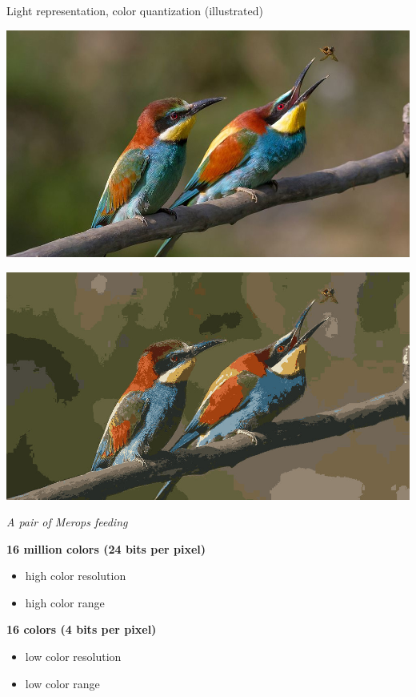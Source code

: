 \begin{frame}{Light representation, color quantization (illustrated)}
  \begin{minipage}[b]{0.45\textwidth}
    \centering
    \includegraphics[width=\textwidth]{slides/graphics-introduction/pair-of-merops.jpg}
  \end{minipage}
  \hfill
  \begin{minipage}[b]{0.45\textwidth}
    \centering
    \includegraphics[width=\textwidth]{slides/graphics-introduction/pair-of-merops-16-colors.jpg}
  \end{minipage}

  \begin{center}
     \textit{\small A pair of Merops feeding}
  \end{center}

  \begin{minipage}[b]{0.45\textwidth}
    \centering
    \textbf{16 million colors (24 bits per pixel)}
    \begin{itemize}
    \item high color resolution
    \item high color range
    \end{itemize}
  \end{minipage}
  \hfill
  \begin{minipage}[b]{0.45\textwidth}
    \centering
    \textbf{16 colors (4 bits per pixel)}
    \begin{itemize}
    \item low color resolution
    \item low color range
    \end{itemize}
  \end{minipage}
\end{frame}

